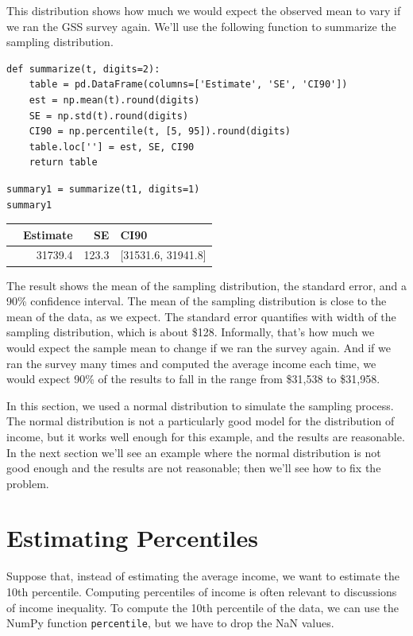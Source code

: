 This distribution shows how much we would expect the observed mean to
vary if we ran the GSS survey again. We'll use the following function to
summarize the sampling distribution.

\begin{lstlisting}[]
def summarize(t, digits=2):
    table = pd.DataFrame(columns=['Estimate', 'SE', 'CI90'])
    est = np.mean(t).round(digits)
    SE = np.std(t).round(digits)
    CI90 = np.percentile(t, [5, 95]).round(digits)
    table.loc[''] = est, SE, CI90
    return table
\end{lstlisting}

\begin{lstlisting}[]
summary1 = summarize(t1, digits=1)
summary1
\end{lstlisting}

\begin{tabular}{lrrl}
\midrule
{} &  Estimate &     SE &                CI90 \\
\midrule
{} &   31739.4 &  123.3 &  [31531.6, 31941.8] \\
\midrule
\end{tabular}

The result shows the mean of the sampling distribution, the standard
error, and a 90\% confidence interval. The mean of the sampling
distribution is close to the mean of the data, as we expect. The
standard error quantifies with width of the sampling distribution, which
is about \$128. Informally, that's how much we would expect the sample
mean to change if we ran the survey again. And if we ran the survey many
times and computed the average income each time, we would expect 90\% of
the results to fall in the range from \$31,538 to \$31,958.

In this section, we used a normal distribution to simulate the sampling
process. The normal distribution is not a particularly good model for
the distribution of income, but it works well enough for this example,
and the results are reasonable. In the next section we'll see an example
where the normal distribution is not good enough and the results are not
reasonable; then we'll see how to fix the problem.

\hypertarget{estimating-percentiles}{%
\section{Estimating Percentiles}\label{estimating-percentiles}}

Suppose that, instead of estimating the average income, we want to
estimate the 10th percentile. Computing percentiles of income is often
relevant to discussions of income inequality. To compute the 10th
percentile of the data, we can use the NumPy function
\passthrough{\lstinline!percentile!}, but we have to drop the NaN
values.

